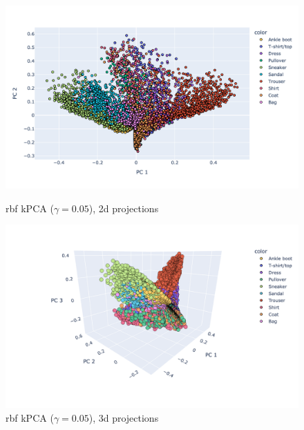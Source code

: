  \begin{figure}[!htb]
    \begin{minipage}{0.5\textwidth}
      \centering
      \includegraphics[width=1\linewidth]{images/rbfPCA_2PC.png}
      \caption{\footnotesize rbf kPCA ($\gamma=0.05$), 2d projections}\label{Fig:kPCA_2PC}
    \end{minipage}\hfill
    \begin{minipage}{0.5\textwidth}
      \centering
      \includegraphics[width=1\linewidth]{images/rbfPCA_3PC.png}
      \caption{\footnotesize rbf kPCA ($\gamma=0.05$), 3d projections}\label{Fig:kPCA_3PC}
    \end{minipage}
 \end{figure}

